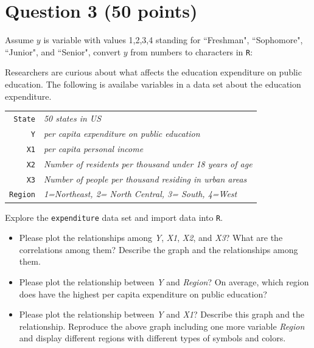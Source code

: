 \documentclass[12pt,letterpaper]{article}
\begin{document}
\vspace{1cm}
	\section*{Question 3 (50 points)}
Assume $y$ is variable with values 1,2,3,4 standing for ``Freshman", ``Sophomore", ``Junior", and ``Senior", convert $y$ from numbers to characters in \texttt{R}:
\vspace{.5cm}
  
\vspace{.5cm}

\noindent Researchers are curious about what affects the education expenditure on public education. The following is availabe variables in a data set about the education expenditure. \\
\vspace{.5cm}


\begin{tabular}{r|l}
	\texttt{State} &\emph{50 states in US} \\
	\texttt{Y} & \emph{per capita expenditure on public education}\\
	\texttt{X1} &\emph{per capita personal income} \\
	\texttt{X2} &  \emph{Number of residents per thousand under 18 years of age}\\
	\texttt{X3} &  \emph{Number of people per thousand residing in urban areas} \\
	\texttt{Region} &  \emph{1=Northeast, 2= North Central, 3= South, 4=West} \\
\end{tabular}

\vspace{.5cm}
\noindent Explore the \texttt{expenditure} data set and import data into \texttt{R}.
\vspace{.5cm}
  
\vspace{.5cm}
\begin{itemize}

\item
Please plot the relationships among \emph{Y}, \emph{X1}, \emph{X2}, and \emph{X3}? What are the correlations among them? Describe the graph and the relationships among them.
\vspace{.5cm}
\item
Please plot the relationship between \emph{Y} and \emph{Region}? On average, which region does have the highest per capita expenditure on public education?
\vspace{.5cm}
\item
Please plot the relationship between \emph{Y} and \emph{X1}? Describe this graph and the relationship. Reproduce the above graph including one more variable \emph{Region} and display different regions with different types of symbols and colors.
\end{itemize}
\end{document}
